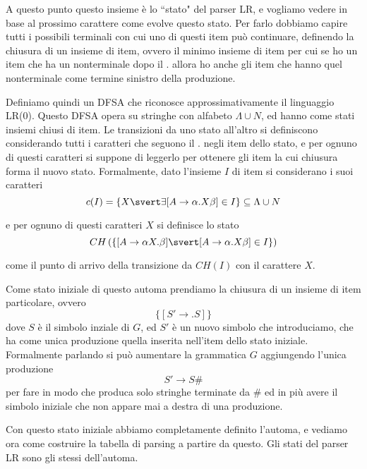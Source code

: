 \documentclass[12pt]{article}
\numberwithin{theorem}{subsection}
\begin{document}
A questo punto questo insieme è lo ``stato" del parser LR, e vogliamo vedere in base al prossimo carattere come evolve questo stato. Per farlo dobbiamo capire tutti i possibili terminali con cui uno di questi item può continuare, definendo la chiusura di un insieme di item, ovvero il minimo insieme di item per cui se ho un item che ha un nonterminale dopo il $.$ allora ho anche gli item che hanno quel nonterminale come termine sinistro della produzione.

Definiamo quindi un DFSA che riconosce approssimativamente il linguaggio LR(0). Questo DFSA opera su stringhe con alfabeto $\Lambda \cup N$, ed hanno come stati insiemi chiusi di item. Le transizioni da uno stato all'altro si definiscono considerando tutti i caratteri che seguono il $.$ negli item dello stato, e per ognuno di questi caratteri si suppone di leggerlo per ottenere gli item la cui chiusura forma il nuovo stato. Formalmente, dato l'insieme $I$ di item si considerano i suoi caratteri
\[
c(I) = \{ X \svert \exists [ A \rightarrow \alpha . X \beta ] \in I \} \subseteq \Lambda \cup N
\]

e per ognuno di questi caratteri $X$ si definisce lo stato 
\[
CH\left( \lbrace [ A \rightarrow \alpha X . \beta ] \svert [ A \rightarrow \alpha . X \beta ] \in I \rbrace \right)
\]

come il punto di arrivo della transizione da $CH(I)$ con il carattere $X$.

Come stato iniziale di questo automa prendiamo la chiusura di un insieme di item particolare, ovvero
\[
\{ [ S' \rightarrow .S ] \}
\]
dove $S$ è il simbolo inziale di $G$, ed $S'$ è un nuovo simbolo che introduciamo, che ha come unica produzione quella inserita nell'item dello stato iniziale. Formalmente parlando si può aumentare la grammatica $G$ aggiungendo l'unica produzione
\[
S' \rightarrow S\#
\]
per fare in modo che produca solo stringhe terminate da \# ed in più avere il simbolo iniziale che non appare mai a destra di una produzione.

Con questo stato iniziale abbiamo completamente definito l'automa, e vediamo ora come costruire la tabella di parsing a partire da questo. Gli stati del parser LR sono gli stessi dell'automa.
\end{document}
